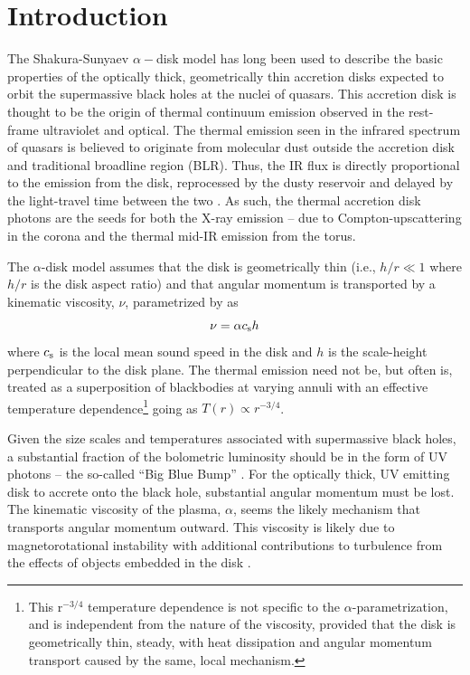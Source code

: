 \documentclass[a4paper,fleqn,usenatbib]{mnras}
\begin{document}
\section{Introduction}
The Shakura-Sunyaev $\alpha-$disk model \citep{SS73} has long been
used to describe the basic properties of the optically thick,
geometrically thin accretion disks expected to orbit the supermassive
black holes at the nuclei of quasars. This accretion disk is thought
to be the origin of thermal continuum emission observed in the
rest-frame ultraviolet and optical. The thermal emission seen in the
infrared spectrum of quasars is believed to originate from molecular
dust outside the accretion disk and traditional broadline region
(BLR). Thus, the IR flux is directly proportional to the emission from
the disk, reprocessed by the dusty reservoir and delayed by the
light-travel time between the two \citep[see e.g.,][for
reviews]{Antonucci1993, Perlman2008, Lasota2016}. As such, the thermal
accretion disk photons are the seeds for both the X-ray emission --
due to Compton-upscattering in the corona
\citep[e.g.,][]{Begelman1983, Risaliti2009, Lusso2017} and the thermal
mid-IR emission from the torus.

The $\alpha$-disk model assumes that the disk is geometrically thin
(i.e., $h/r \ll 1$ where $h/r$ is the disk aspect ratio) and that
angular momentum is transported by a kinematic viscosity, $\nu$,
parametrized by \citet{SS73} as 
\begin{equation}
\nu = \alpha c_{\rm s} h 
\end{equation}
where
$c_{\rm s}$ is the local mean sound speed in the disk and $h$ is the
scale-height perpendicular to the disk plane. The thermal emission
need not be, but often is, treated as a superposition of blackbodies
at varying annuli with an effective temperature
dependence\footnote{This r$^{-3/4}$ temperature dependence is not
specific to the $\alpha$-parametrization, and is independent from the
nature of the viscosity, provided that the disk is geometrically thin,
steady, with heat dissipation and angular momentum transport caused
by the same, local mechanism.} going as $T(r) \propto r^{-3/4}$.

Given the size scales and temperatures associated with supermassive
black holes, a substantial fraction of the bolometric luminosity
should be in the form of UV photons -- the so-called ``Big Blue Bump''
\citep{Shields1978, Malkan_Sargent1982}. For the optically thick, UV
emitting disk to accrete onto the black hole, substantial angular
momentum must be lost.  The kinematic viscosity of the plasma,
$\alpha$, seems the likely mechanism that transports angular momentum
outward.  This viscosity is likely due to magnetorotational
instability \citep[MRI; ][]{Balbus_Hawley1991} with additional
contributions to turbulence from the effects of objects embedded in
the disk \citep[e.g.,][]{McKernan2014}.
\end{document}
